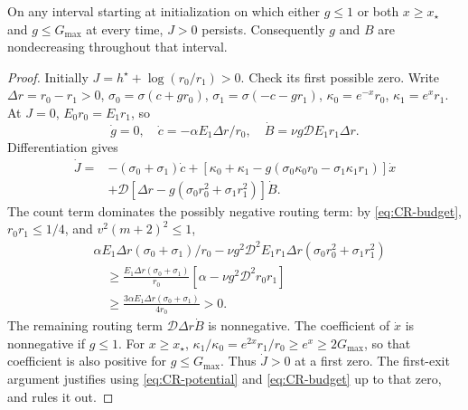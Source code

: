 \begin{lemma}
\label{lem:CR-monotone}
On any interval starting at initialization on which either $g\le1$ or both $x\ge x_\star$ and $g\le G_{\max}$ at every time,
$J>0$ persists. Consequently $g$ and $B$ are nondecreasing throughout that interval.
\end{lemma}
\begin{proof}
Initially $J=h^\star+\log(r_0/r_1)>0$. Check its first possible zero.
Write $\Delta r=r_0-r_1>0$, $\sigma_0=\sigma(c+gr_0)$, $\sigma_1=\sigma(-c-gr_1)$,
$\kappa_0=e^{-x}r_0$, $\kappa_1=e^xr_1$.
At $J=0$, $E_0r_0=E_1r_1$, so
\[
 \dot g=0,\quad \dot c=-\alpha E_1\Delta r/r_0,\quad
 \dot B=\nu g\mathcal DE_1r_1\Delta r.
\]
Differentiation gives
\begin{align*}
 \dot J={}&-(\sigma_0+\sigma_1)\dot c
 +[\kappa_0+\kappa_1-g(\sigma_0\kappa_0r_0-\sigma_1\kappa_1r_1)]\dot x\\
 &+\mathcal D[\Delta r-g(\sigma_0r_0^2+\sigma_1r_1^2)]\dot B.
\end{align*}
The count term dominates the possibly negative routing term: by \eqref{eq:CR-budget}, $r_0r_1\le1/4$, and $v^2(m+2)^2\le1$,
\begin{align*}
 &\alpha E_1\Delta r(\sigma_0+\sigma_1)/r_0
 -\nu g^2\mathcal D^2E_1r_1\Delta r(\sigma_0r_0^2+\sigma_1r_1^2)\\
 &\hspace{1em}\ge\frac{E_1\Delta r(\sigma_0+\sigma_1)}{r_0}
       [\alpha-\nu g^2\mathcal D^2r_0r_1]\\
 &\hspace{1em}\ge\frac{3\alpha E_1\Delta r(\sigma_0+\sigma_1)}{4r_0}>0.
\end{align*}
The remaining routing term $\mathcal D\Delta r\dot B$ is nonnegative.
The coefficient of $\dot x$ is nonnegative if $g\le1$.
For $x\ge x_\star$, $\kappa_1/\kappa_0=e^{2x}r_1/r_0\ge e^x\ge2G_{\max}$, so that coefficient is also positive for $g\le G_{\max}$.
Thus $\dot J>0$ at a first zero. The first-exit argument justifies using \eqref{eq:CR-potential} and \eqref{eq:CR-budget} up to that zero, and rules it out.
\end{proof}

